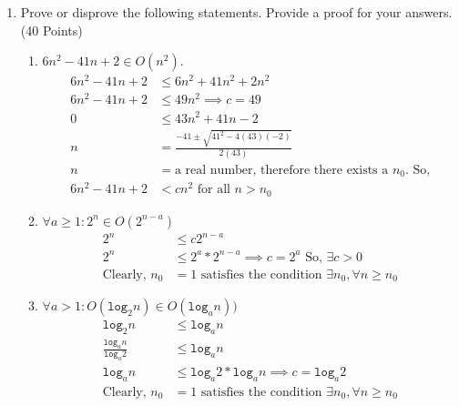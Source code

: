 \documentclass[11pt]{article}
\begin{document}
    \begin{enumerate}

        \item Prove or disprove the following statements. Provide a proof for
        your answers.
        \hfill (40 Points)
        \begin{enumerate}
            \item $6n^2-41n+2 \in O(n^2)$.
            \begin{align*}
                6n^2 - 41n + 2 &\leq 6n^2 + 41n^2 + 2n^2 \\
                6n^2 - 41n + 2 &\leq 49n^2 \implies c = 49 \\
                0 &\leq 43n^2 + 41n - 2 \\
                n &= \frac{-41 \pm \sqrt{41^2 - 4(43)(-2)}}{2(43)} \\
                n &= \text{a real number, therefore there exists a } n_0 \text{. So,} \\
                6n^2 - 41n + 2 &< cn^2 \text{ for all } n > n_0
            \end{align*}
            \item $\forall a \geq 1: 2^{n}  \in  O(2^{n-a})$
            \begin{align*}
                2^n &\leq c2^{n-a} \\
                2^n &\leq 2^a*2^{n-a} \implies c = 2^{a} \text{ So, } \exists c > 0  \\
                \text{Clearly, } n_0 &= 1 \text{ satisfies the condition } \exists n_0 , \forall n \geq n_0
            \end{align*}
            \item $\forall a > 1: O(\mathtt{log}_2 n) \in O(\mathtt{log}_a n))$
            \begin{align*}
                \mathtt{log}_2 n &\leq \mathtt{log}_a n \\
                \frac{\mathtt{log}_a n}{\mathtt{log}_a 2} &\leq \mathtt{log}_a n \\
                \mathtt{log}_a n &\leq \mathtt{log}_a 2 * \mathtt{log}_a n \implies c = \mathtt{log}_a 2 \\
                \text{Clearly, } n_0 &= 1 \text{ satisfies the condition } \exists n_0 , \forall n \geq n_0
            \end{align*}
            \newpage



\end{enumerate}
\end{enumerate}
\end{document}
